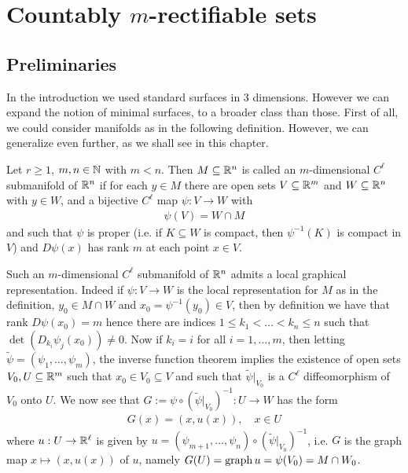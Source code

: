 \chapter{Countably $m$-rectifiable sets}

\section{Preliminaries}
In the introduction we used standard surfaces in 3 dimensions. However we can expand the notion of minimal surfaces, to a broader class than those. First of all, we could consider manifolds as in the following definition. However, we can generalize even further, as we shall see in this chapter.

\begin{definition}\label{def: submanifold}
Let $r \ge 1$, $m, n \in \mathbb{N}$ with $m<n$. Then $M \subseteq \mathbb{R}^{n}$ is called an $m$-dimensional $C^{\ell}$ submanifold of $\mathbb{R}^{n}$ if for each $y \in M$ there are open sets $V \subseteq \mathbb{R}^{m}$ and $W \subseteq \mathbb{R}^{n}$ with $y \in W$, and a bijective $C^{\ell}$ map $\psi:V \to W$ with
\begin{align*}
	\psi(V) = W \cap M
\end{align*}
and such that $\psi$ is proper (i.e. if $K \subseteq W$ is compact, then $\psi^{-1}(K)$ is compact in $V$) and $D\psi(x)$ has rank $m$ at each point $x \in V$.
\end{definition}

Such an $m$-dimensional $C^{\ell}$ submanifold of $\mathbb{R}^{n}$ admits a local graphical representation. Indeed if $\psi:V \to W$ is the local representation for $M$ as in the definition, $y_{0} \in M \cap W$ and $x_{0} = \psi^{-1}(y_{0}) \in V$, then by definition we have that rank $D\psi(x_{0})=m$ hence there are indices $1 \le k_{1} < \dots < k_{n} \le n$ such that $\det(D_{k_{i}}\psi_{j}(x_{0})) \neq 0$. Now if $k_{i}=i$ for all $i = 1, \dots, m$, then letting $\tilde \psi = (\psi_{1}, \dots, \psi_{m})$, the inverse function theorem implies the existence of open sets $V_{0},U \subseteq \mathbb{R}^{m}$ such that $x_{0} \in V_{0} \subseteq V$ and such that $\tilde \psi|_{V_{0}}$ is a $C^{\ell}$ diffeomorphism of $V_{0}$ onto $U$. 
We now see that $G := \psi \circ (\tilde \psi|_{V_{0}})^{-1}:U \to W$ has the form
\begin{align*}
	G(x) = (x,u(x)), \quad x \in U
\end{align*}
where $u:U \to \mathbb{R}^{\ell}$ is given by $u=(\psi_{m+1}, \dots, \psi_{n}) \circ (\tilde \psi|_{V_{0}})^{-1}$, i.e. $G$ is the graph map $x \mapsto (x, u(x))$ of $u$, namely $G(U)=\operatorname{graph} u=\psi(V_{0}) = M \cap W_{0}$.

